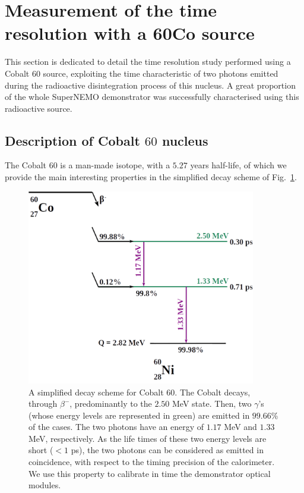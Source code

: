 \section{Measurement of the time resolution with a 60Co source}
\label{sec:Co_analysis}
This section is dedicated to detail the time resolution study performed using a Cobalt $60$ source, exploiting the time characteristic of two photons emitted during the radioactive disintegration process of this nucleus.
A great proportion of the whole SuperNEMO demonstrator was successfully characterised using this radioactive source.

\subsection{Description of Cobalt $60$ nucleus}
\label{subsec:CoSource}
The Cobalt $60$ is a man-made isotope, with a $5.27$ years half-life, of which we provide the main interesting properties in the simplified decay scheme of Fig.~\ref{fig:Co_decay_scheme}.
\begin{figure}[h]
  \centering
  \includegraphics[width=10cm]{commissioning/fig_commissioning/Co_decay_scheme.pdf}
  \caption{A simplified decay scheme for Cobalt $60$.
    The Cobalt decays, through $\beta^{-}$, predominantly to the $2.50$ MeV state.
    Then, two $\gamma$'s (whose energy levels are represented in green) are emitted in $99.66$\% of the cases.
    The two photons have an energy of $1.17$ MeV and $1.33$ MeV, respectively.
    As the life times of these two energy levels are short ($<1$ ps), the two photons can be considered as emitted in coincidence, with respect to the timing precision of the calorimeter.
    We use this property to calibrate in time the demonstrator optical modules.
    \label{fig:Co_decay_scheme}}
\end{figure}
